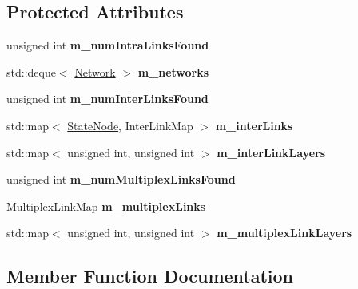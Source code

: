 \subsection*{Protected Attributes}
\begin{DoxyCompactItemize}
\item 
\mbox{\label{classMultiplexNetwork_ad64080ab8bae668365aeeafda9c90d4b}} 
unsigned int {\bfseries m\+\_\+num\+Intra\+Links\+Found}
\item 
\mbox{\label{classMultiplexNetwork_a4134fedee8c504d080afe0edbfe30341}} 
std\+::deque$<$ \mbox{\hyperlink{classNetwork}{Network}} $>$ {\bfseries m\+\_\+networks}
\item 
\mbox{\label{classMultiplexNetwork_abbd21041ec49bfbdfcf2c73ee34581e0}} 
unsigned int {\bfseries m\+\_\+num\+Inter\+Links\+Found}
\item 
\mbox{\label{classMultiplexNetwork_ac18585ae2750ca4e76da62ddd4eaf0b8}} 
std\+::map$<$ \mbox{\hyperlink{structStateNode}{State\+Node}}, Inter\+Link\+Map $>$ {\bfseries m\+\_\+inter\+Links}
\item 
\mbox{\label{classMultiplexNetwork_a21c5521713198e3d1963c29dac1d1850}} 
std\+::map$<$ unsigned int, unsigned int $>$ {\bfseries m\+\_\+inter\+Link\+Layers}
\item 
\mbox{\label{classMultiplexNetwork_a4bd6b433c8bb37918b151439c14e8ba7}} 
unsigned int {\bfseries m\+\_\+num\+Multiplex\+Links\+Found}
\item 
\mbox{\label{classMultiplexNetwork_ab3a86bc9e4f43f056030dc0f062102dc}} 
Multiplex\+Link\+Map {\bfseries m\+\_\+multiplex\+Links}
\item 
\mbox{\label{classMultiplexNetwork_a214487528d6974cab509740cfc2cf275}} 
std\+::map$<$ unsigned int, unsigned int $>$ {\bfseries m\+\_\+multiplex\+Link\+Layers}
\end{DoxyCompactItemize}


\subsection{Member Function Documentation}
\mbox{\label{classMultiplexNetwork_a48d45b3e0738f2e755e67ebf7aeac728}} 
